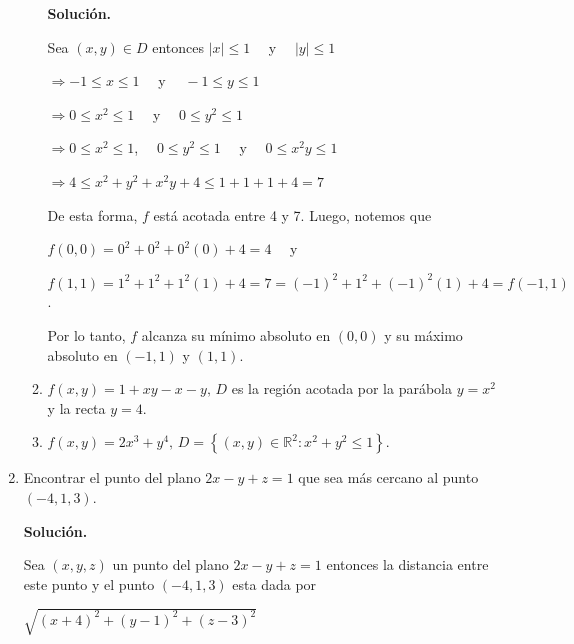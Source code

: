 \documentclass[fleqn, 12pt]{article}
\begin{document}
\begin{enumerate}
\begin{enumerate}
            \textbf{Solución.}

            Sea $ (x,y) \in D $ entonces $ \lvert x \rvert \leq 1 \quad $ y $ \quad \lvert y \rvert \leq 1 $

            $ \Longrightarrow -1 \leq x \leq 1 \quad $ y $ \quad -1 \leq y \leq 1 $

            $ \Longrightarrow 0 \leq x^2 \leq 1 \quad $ y $ \quad 0 \leq y^2 \leq 1 $

            $ \Longrightarrow 0 \leq x^2 \leq 1 $, $ \quad 0 \leq y^2 \leq 1 \quad $ y $ \quad 0 \leq x^2 y \leq 1 $

            $ \Longrightarrow 4 \leq x^2 + y^2 + x^2 y + 4 \leq 1 + 1 + 1 + 4 = 7 $

            De esta forma, $ f $ está acotada entre 4 y 7. Luego, notemos que 
            
            $ f(0,0) = 0^2 + 0^2 + 0^2 (0) + 4 = 4 \quad $ y 
            
            $ f(1,1) = 1^2 + 1^2 + 1^2 (1) + 4 = 7 = (-1)^2 + 1^2 + (-1)^2 (1) + 4 = f(-1,1) $.

            Por lo tanto, $ f $ alcanza su mínimo absoluto en $ (0,0) $ y su máximo absoluto en $ (-1,1) $ y $ (1,1) $.

            \item $ f(x,y) = 1 + xy - x - y, \, D $ es la región acotada por la parábola $ y = x^2 $ y la recta $ y = 4 $.
            

            \item $ f(x,y) = 2x^3 + y^4, \, D = \left\lbrace (x,y) \in \mathbb{R}^2 : x^2 + y^2 \leq 1 \right\rbrace $.
            
        \end{enumerate}
        \item Encontrar el punto del plano $ 2x - y + z = 1 $ que sea más cercano al punto $ (-4,1,3) $.

        \textbf{Solución.}
        
        Sea $ (x,y,z) $ un punto del plano $ 2x - y + z = 1 $ entonces la distancia entre este punto y el punto $ (-4,1,3) $ esta dada por 

        $ \sqrt{(x + 4)^2 + (y - 1)^2 + (z - 3)^2} $


\end{enumerate}
\end{document}
